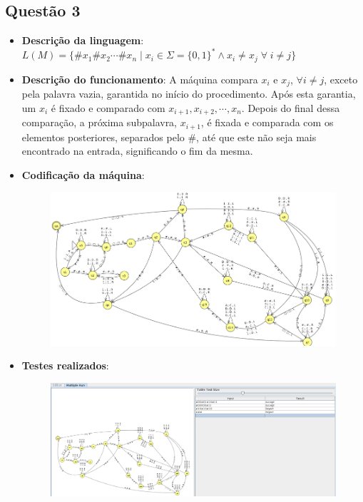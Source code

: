 \documentclass{article}
\begin{document}
\newpage

\subsection*{Questão 3}

\begin{itemize}

    \item \textbf{Descrição da linguagem}:
        $L(M) = \{ \#x_1\#x_2 \cdots \#x_n \mid x_i \in \Sigma = \{0,1\}^*
            \land x_i \neq x_j \; \forall \; i \neq j\}$

    \item \textbf{Descrição do funcionamento}: A máquina compara
        $x_i$ e $x_j$, $\forall i\neq j$, exceto pela palavra vazia, garantida
        no início do procedimento. Após esta garantia, um $x_i$ é fixado e
        comparado com $x_{i+1}, x_{i+2}, \cdots, x_n$. Depois do final dessa
        comparação, a próxima subpalavra, $x_{i+1}$, é fixada e comparada com
        os elementos posteriores, separados pelo \#, até que este não seja
        mais encontrado na entrada, significando o fim da mesma.

    \item \textbf{Codificação da máquina}:

        \begin{figure}[htbp]
            \centering
            \includegraphics[scale=0.5]{images/questao3_ss.png}
        \end{figure}

    \item \textbf{Testes realizados}:

        \begin{figure}[htbp]
            \centering
            \includegraphics[width=\textwidth]{images/questao3_inputs.png}
        \end{figure}

\end{itemize}
\end{document}

